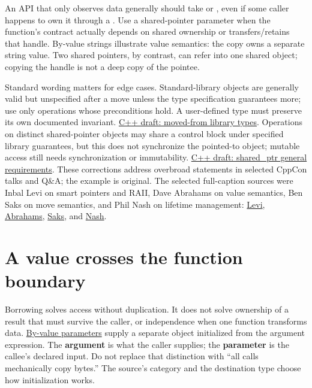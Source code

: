 An API that only observes data generally should take  or , even if some caller happens to own it through a . Use a shared-pointer parameter when the function's contract actually depends on shared ownership or transfers/retains that handle. By-value strings illustrate value semantics: the copy owns a separate string value. Two shared pointers, by contrast, can refer into one shared object; copying the handle is not a deep copy of the pointee.

Standard wording matters for edge cases. Standard-library objects are generally valid but unspecified after a move unless the type specification guarantees more; use only operations whose preconditions hold. A user-defined type must preserve its own documented invariant. \href{https://eel.is/c++draft/lib.types.movedfrom}{C++ draft: moved-from library types}. Operations on distinct shared-pointer objects may share a control block under specified library guarantees, but this does not synchronize the pointed-to object; mutable access still needs synchronization or immutability. \href{https://eel.is/c++draft/util.smartptr.shared}{C++ draft: shared\_ptr general requirements}. These corrections address overbroad statements in selected CppCon talks and Q\&A; the example is original. The selected full-caption sources were Inbal Levi on smart pointers and RAII, Dave Abrahams on value semantics, Ben Saks on move semantics, and Phil Nash on lifetime management: \href{https://www.youtube.com/watch?v=07rJOzFRs6M}{Levi}, \href{https://www.youtube.com/watch?v=QthAU-t3PQ4}{Abrahams}, \href{https://www.youtube.com/watch?v=szU5b972F7E}{Saks}, and \href{https://www.youtube.com/watch?v=aMvIv6blzBs}{Nash}.

\section{A value crosses the function boundary}\label{01-foundations-i-ch003-a-value-crosses-the-function-boundary}

\hypertarget{01-foundations-i-ch003-a-value-crosses-the-function-boundary}{}

Borrowing solves access without duplication. It does not solve ownership of a result that must survive the caller, or independence when one function transforms data. \hyperref[appendix-d5908f75721f]{By-value parameters} supply a separate object initialized from the argument expression. The \textbf{argument} is what the caller supplies; the \textbf{parameter} is the callee's declared input. Do not replace that distinction with ``all calls mechanically copy bytes.'' The source's category and the destination type choose how initialization works.

